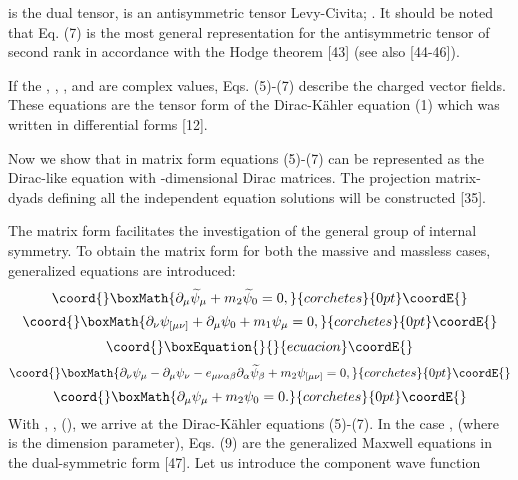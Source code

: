 \documentclass[a4paper,12pt]{article}
\begin{document}
is the dual tensor, \myHighlight{$\varepsilon _{\mu \nu \alpha \beta }$}\coordHE{} is an
antisymmetric tensor Levy-Civita; \coordHE{}. It should be
noted that Eq. (7) is the most general representation for the antisymmetric
tensor of second rank in accordance with the Hodge theorem [43] (see also
[44-46]).

If the \myHighlight{$\varphi $}\coordHE{}, \myHighlight{$\widetilde{\varphi }$}\coordHE{}, \myHighlight{$\varphi _\mu $}\coordHE{},
\myHighlight{$\widetilde{ \varphi }_\mu $}\coordHE{} and \myHighlight{$\varphi _{\mu \nu }$}\coordHE{} are complex
values, Eqs. (5)-(7) describe the charged vector fields. These
equations are the tensor form of the Dirac-K\"ahler equation (1)
which was written in differential forms [12].

Now we show that in matrix form equations (5)-(7) can be represented as the
Dirac-like equation with \coordHE{} -dimensional Dirac matrices. The
projection matrix-dyads defining all the \coordHE{} independent equation solutions
will be constructed [35].

The matrix form facilitates the investigation of the general group of
internal symmetry. To obtain the matrix form for both the massive and
massless cases, generalized equations are introduced:
\[\coord{}\boxMath{
\partial _\mu \widetilde{\psi }_\mu +m_2\widetilde{\psi }_0=0 ,
}{corchetes}{0pt}\coordE{}\]
\[\coord{}\boxMath{
\partial _\nu \psi _{[\mu \nu ]}+\partial _\mu \psi _0+m_1\psi _\mu
=0 ,
}{corchetes}{0pt}\coordE{}\]
\vspace{-8mm}
\begin{equation}\coord{}\boxEquation{  \label{9}
}{  }{ecuacion}\coordE{}\end{equation}
\vspace{-8mm}
\[\coord{}\boxMath{
\partial _\nu \psi _\mu -\partial _\mu \psi _\nu -e_{\mu \nu \alpha \beta
}\partial _\alpha \widetilde{\psi }_\beta +m_2\psi _{[\mu \nu ]}=0
,
}{corchetes}{0pt}\coordE{}\]
\[\coord{}\boxMath{
\partial _\mu \psi _\mu +m_2\psi _0=0 .
}{corchetes}{0pt}\coordE{}\]
With \coordHE{}  \coordHE{}, \coordHE{}, \myHighlight{$\psi _{[\mu \nu ]}=\varphi _{\mu \nu },$}\coordHE{}  \coordHE{}  \coordHE{}  \coordHE{} (\coordHE{}), we arrive
at the Dirac-K\"ahler equations (5)-(7). In the case \coordHE{}, \coordHE{} (where \coordHE{} is the dimension parameter), Eqs. (9) are
the generalized Maxwell equations in the dual-symmetric form [47].
Let us introduce the \coordHE{}component wave function
\end{document}
